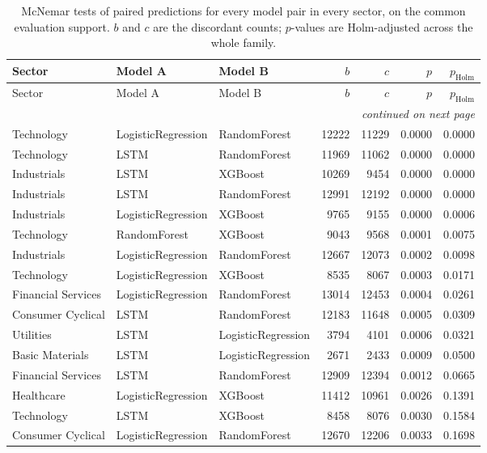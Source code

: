\begin{longtable}{lllrrrr}
\caption{McNemar tests of paired predictions for every model pair in every sector, on the common evaluation support. $b$ and $c$ are the discordant counts; $p$-values are Holm-adjusted across the whole family.}\label{tab:mcnemar}\\
\toprule
Sector & Model A & Model B & $b$ & $c$ & $p$ & $p_{\text{Holm}}$ \\
\midrule
\endfirsthead
\toprule
Sector & Model A & Model B & $b$ & $c$ & $p$ & $p_{\text{Holm}}$ \\
\midrule
\endhead
\midrule \multicolumn{7}{r}{\emph{continued on next page}}\\
\endfoot
\bottomrule
\endlastfoot
Technology & LogisticRegression & RandomForest & 12222 & 11229 & 0.0000 & 0.0000 \\
Technology & LSTM & RandomForest & 11969 & 11062 & 0.0000 & 0.0000 \\
Industrials & LSTM & XGBoost & 10269 & 9454 & 0.0000 & 0.0000 \\
Industrials & LSTM & RandomForest & 12991 & 12192 & 0.0000 & 0.0000 \\
Industrials & LogisticRegression & XGBoost & 9765 & 9155 & 0.0000 & 0.0006 \\
Technology & RandomForest & XGBoost & 9043 & 9568 & 0.0001 & 0.0075 \\
Industrials & LogisticRegression & RandomForest & 12667 & 12073 & 0.0002 & 0.0098 \\
Technology & LogisticRegression & XGBoost & 8535 & 8067 & 0.0003 & 0.0171 \\
Financial Services & LogisticRegression & RandomForest & 13014 & 12453 & 0.0004 & 0.0261 \\
Consumer Cyclical & LSTM & RandomForest & 12183 & 11648 & 0.0005 & 0.0309 \\
Utilities & LSTM & LogisticRegression & 3794 & 4101 & 0.0006 & 0.0321 \\
Basic Materials & LSTM & LogisticRegression & 2671 & 2433 & 0.0009 & 0.0500 \\
Financial Services & LSTM & RandomForest & 12909 & 12394 & 0.0012 & 0.0665 \\
Healthcare & LogisticRegression & XGBoost & 11412 & 10961 & 0.0026 & 0.1391 \\
Technology & LSTM & XGBoost & 8458 & 8076 & 0.0030 & 0.1584 \\
Consumer Cyclical & LogisticRegression & RandomForest & 12670 & 12206 & 0.0033 & 0.1698 \\

\end{longtable}
